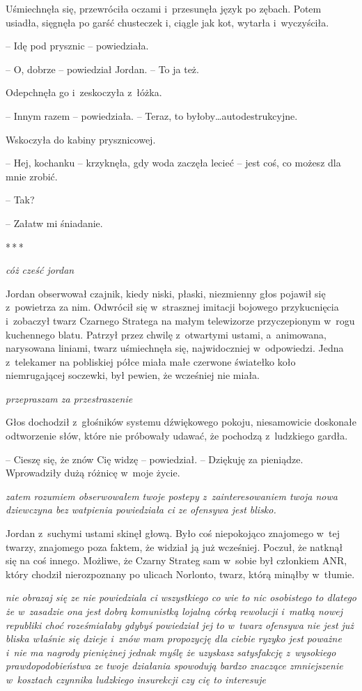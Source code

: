 \documentclass[oneside,polish,11pt,sfheadings]{mwbk}
\newcommand{\threeast}{\bigskip\par\centerline{*\,*\,*}\medskip\par}%
\begin{document}
Uśmiechnęła się, przewróciła oczami i~przesunęła język po zębach. Potem
usiadła, sięgnęła po garść chusteczek i, ciągle jak kot, wytarła i~wyczyściła.

-- Idę pod prysznic -- powiedziała.

-- O, dobrze -- powiedział Jordan. -- To ja też.

Odepchnęła go i~zeskoczyła z~łóżka.

-- Innym razem -- powiedziała. -- Teraz, to byłoby\ldots autodestrukcyjne.

Wskoczyła do kabiny prysznicowej.

-- Hej, kochanku -- krzyknęła, gdy woda zaczęła lecieć -- jest coś, co
możesz dla mnie zrobić.

-- Tak?

-- Załatw mi śniadanie.
  \threeast 

\emph{cóż cześć jordan}

Jordan obserwował czajnik, kiedy niski, płaski, niezmienny głos pojawił
się z~powietrza za nim. Odwrócił się w~strasznej imitacji bojowego
przykucnięcia i~zobaczył twarz Czarnego Stratega na małym telewizorze
przyczepionym w~rogu kuchennego blatu. Patrzył przez chwilę z~otwartymi
ustami, a~animowana, narysowana liniami, twarz uśmiechnęła się,
najwidoczniej w~odpowiedzi. Jedna z~telekamer na pobliskiej półce miała
małe czerwone światełko koło niemrugającej soczewki, był pewien, że
wcześniej nie miała.

\emph{przepraszam za przestraszenie}

Głos dochodził z~głośników systemu dźwiękowego pokoju, niesamowicie
doskonałe odtworzenie słów, które nie próbowały udawać, że pochodzą z~ludzkiego gardła.

-- Cieszę się, że znów Cię widzę -- powiedział. -- Dziękuję za pieniądze.
Wprowadziły dużą różnicę w~moje życie.

\emph{zatem rozumiem obserwowałem twoje postepy z~zainteresowaniem twoja
nowa dziewczyna bez watpienia powiedziała ci ze ofensywa jest blisko.}

Jordan z~suchymi ustami skinęł głową. Było coś niepokojąco znajomego w~tej twarzy, znajomego poza faktem, że widział ją już wcześniej. Poczuł,
że natknął się na coś innego. Możliwe, że Czarny Strateg sam w~sobie był
członkiem ANR, który chodził nierozpoznany po ulicach Norlonto, twarz,
którą minąłby w~tłumie.

\emph{nie obrazaj się ze nie powiedziala ci wszystkiego co wie to nic
osobistego to dlatego że w~zasadzie ona jest dobrą komunistką lojalną
córką rewolucji i~matką nowej republiki choć roześmiałaby gdybyś
powiedział jej to w~twarz ofensywa nie jest już bliska właśnie się
dzieje i~znów mam propozycję dla ciebie ryzyko jest poważne i~nie ma
nagrody pieniężnej jednak myślę że uzyskasz satysfakcję z~wysokiego
prawdopodobieństwa ze twoje działania spowodują bardzo znaczące
zmniejszenie w~kosztach czynnika ludzkiego insurekcji czy cię to
interesuje}
\end{document}
